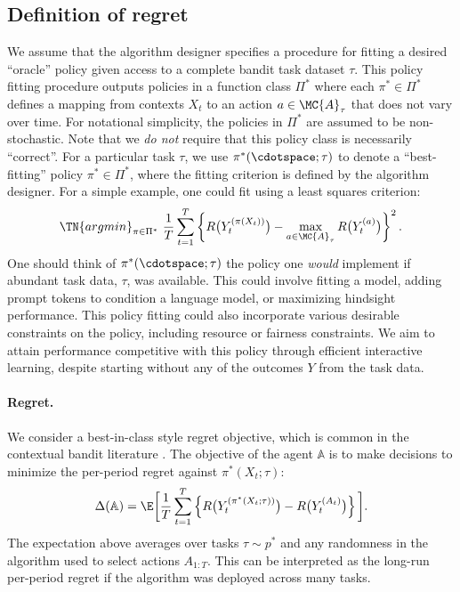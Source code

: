 \subsection{Definition of regret}
\label{sec:regretDef}
We assume that the algorithm designer specifies a procedure for fitting a desired ``oracle'' policy given access to a complete bandit task dataset $\tau$. This policy fitting procedure outputs policies in a function class $\Pi^*$ where each $\pi^* \in \Pi^*$ defines a mapping from contexts $X_t$ to an action $a \in \MC{A}_{\tau}$ that does not vary over time. For notational simplicity, the policies in $\Pi^*$ are assumed to be non-stochastic. Note that we \textit{do not} require that this policy class is necessarily ``correct''. For a particular task $\tau$, we use $\pi^*(\cdotspace; \tau)$ to denote a ``best-fitting'' policy $\pi^* \in \Pi^*$, where the fitting criterion is defined by the algorithm designer. 
For a simple example, one could fit using a least squares criterion:
\begin{align*}
    \TN{argmin}_{\pi \in \Pi^*} ~ \frac{1}{T} \sum_{t=1}^T \left\{ R \big(Y_t^{(\pi(X_t))} \big) - \max_{a \in \MC{A}_{\tau}} R \big(Y_t^{(a)} \big) \right\}^2.
\end{align*}
One should think of $\pi^*(\cdotspace; \tau)$ the policy one \emph{would} implement if abundant task data, $\tau$, was available. This could involve fitting a model, adding prompt tokens to condition a language model, or maximizing hindsight performance. This policy fitting could also incorporate various desirable constraints on the policy, including resource or fairness constraints. We aim to attain performance competitive with this policy through efficient interactive learning, despite starting without any of the outcomes $Y$ from the task data. 


\paragraph{Regret.} 
We consider a best-in-class style regret objective, which is common in the contextual bandit literature \citep{foster2020open,foster2019model,langford2007epoch,agarwal2017corralling}. The objective of the agent $\mathbb{A}$ is to make decisions to minimize the per-period regret against $\pi^*(X_t; \tau)$: 
\begin{align}
    \label{eqn:regretContext}
    \hspace{-1mm}\Delta(\mathbb{A}) = \E \bigg[ \frac{1}{T} \sum_{t=1}^T \left\{ R \big(Y_{t}^{(\pi^*(X_t; \tau))} \big) - R \big( Y_{t}^{(A_t)} \big) \right\} \bigg].\hspace{-1mm}
\end{align}
The expectation above averages over tasks $\tau \sim p^*$ and any randomness in the algorithm used to select actions $A_{1:T}$. This can be interpreted as the long-run per-period regret if the algorithm was deployed across many tasks.


